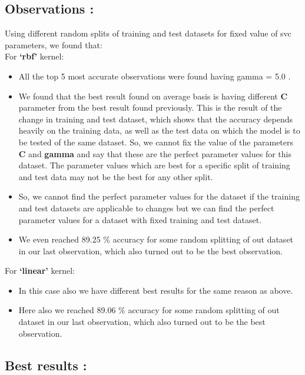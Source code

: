 \documentclass{report}
\begin{document}
\begin{multicols}{2}
\subsection{\LARGE Observations :}
Using different random splits of training and test datasets for fixed value of svc parameters, we found that:\\
\linebreak
\linebreak
For \textbf{‘rbf’} kernel:
\begin{itemize}
\item All the top 5 most accurate observations were found having gamma = 5.0 .
\item We found that the best result found on average basis is having different \textbf{C} parameter from the best result found previously. This is the result of the change in training and test dataset, which shows that the accuracy depends heavily on the training data, as well as the test data on which the model is to be tested of the same dataset. So, we cannot fix the value of the parameters \textbf{C} and \textbf{gamma} 
and say that these are the perfect parameter values for this dataset. The parameter values which are best for a specific split of training and test data may not be the best for any other split.
\item So, we cannot find the perfect parameter values for the dataset if the training and test datasets are applicable to  changes but we can find the perfect parameter values for a dataset with fixed training and test dataset.
\item We even reached 89.25 \% accuracy for some random splitting of out dataset in our last observation, which also turned out to be the best observation.
\end{itemize}
For \textbf{‘linear’} kernel:
\begin{itemize}
\item In this case also we have different best results for the same reason as above.
\item Here also we reached 89.06 \% accuracy for some random splitting of out dataset in our last observation, which also turned out to be the best observation.
\end{itemize}
\subsection{\LARGE Best results :}


\end{multicols}
\end{document}
